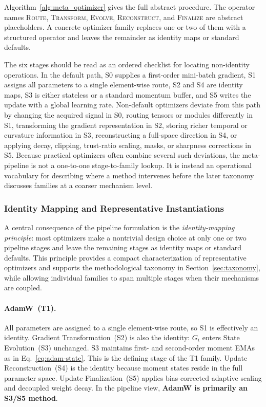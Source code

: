 Algorithm~\ref{alg:meta_optimizer} gives the full abstract procedure.  The
operator names \textsc{Route}, \textsc{Transform}, \textsc{Evolve},
\textsc{Reconstruct}, and \textsc{Finalize} are abstract placeholders.  A
concrete optimizer family replaces one or two of them with a structured
operator and leaves the remainder as identity maps or standard defaults.



The six stages should be read as an ordered checklist for locating
non-identity operations.  In the default path, S0 supplies a first-order
mini-batch gradient, S1 assigns all parameters to a single element-wise route,
S2 and S4 are identity maps, S3 is either stateless or a standard momentum
buffer, and S5 writes the update with a global learning rate.  Non-default
optimizers deviate from this path by changing the acquired signal in S0,
routing tensors or modules differently in S1, transforming the gradient
representation in S2, storing richer temporal or curvature information in S3,
reconstructing a full-space direction in S4, or applying decay, clipping,
trust-ratio scaling, masks, or sharpness corrections in S5.  Because practical
optimizers often combine several such deviations, the meta-pipeline is not a
one-to-one stage-to-family lookup.  It is instead an operational vocabulary for
describing where a method intervenes before the later taxonomy discusses
families at a coarser mechanism level.

\subsubsection{Identity Mapping and Representative Instantiations}
\label{sec:meta-pipeline-identity}

A central consequence of the pipeline formulation is the
\emph{identity-mapping principle}: most optimizers make a nontrivial design
choice at only one or two pipeline stages and leave the remaining stages as
identity maps or standard defaults.  This principle provides a compact
characterization of representative optimizers and supports the methodological
taxonomy in Section~\ref{sec:taxonomy}, while allowing individual families to
span multiple stages when their mechanisms are coupled.

\paragraph{AdamW~\textup{(T1).}}
All parameters are assigned to a single element-wise route, so S1 is
effectively an identity.  Gradient Transformation~(S2) is also the identity:
$G_t$ enters State Evolution~(S3) unchanged.  S3 maintains first- and
second-order moment EMAs as in Eq.~\eqref{eq:adam-state}.  This is the
defining stage of the T1 family.  Update Reconstruction~(S4) is the identity
because moment states reside in the full parameter space.  Update
Finalization~(S5) applies bias-corrected adaptive scaling and decoupled weight
decay.  In the pipeline view, \textbf{AdamW is primarily an S3/S5 method}.

